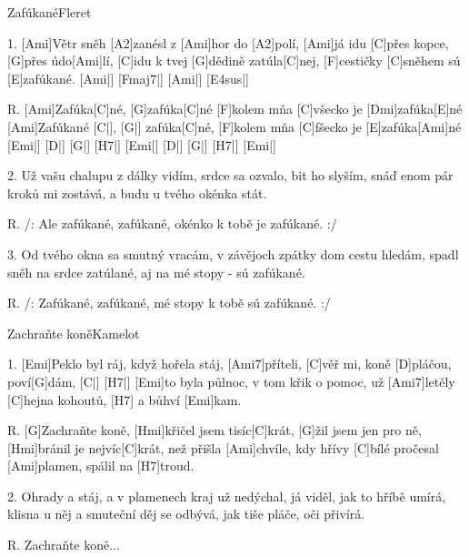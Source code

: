 \begin{song}{Zafúkané}{Fleret}

\begin{xverse}{1. }
[Ami]Větr sněh [A2]zanésl z [Ami]hor do [A2]polí,
[Ami]já idu [C]přes kopce, [G]přes údo[Ami]lí,
[C]idu k tvej [G]dědině zatúla[C]nej,
[F]cestičky [C]sněhem sú [E]zafúkané. [Ami|]{} [Fmaj7|]{} [Ami|]{} [E4sus|]{}
\end{xverse}


\begin{xverse}{R. }
[Ami]Zafúka[C]né, [G]zafúka[C]né
[F]kolem mňa [C]všecko je [Dmi]zafúka[E]né
[Ami]Zafúkané [C|]{}, [G|]{} zafúka[C]né,
[F]kolem mňa [C]fšecko je [E]zafúka[Ami]né
[Emi|]{} [D|]{} [G|]{} [H7|]{} [Emi|]{} [D|]{} [G|]{} [H7|]{} [Emi|]{}
\end{xverse}


\begin{xverse}{2. }
Už vašu chalupu z dálky vidím,
srdce sa ozvalo, bit ho slyším,
snáď enom pár kroků mi zostává,
a budu u tvého okénka stát.
\end{xverse}


\begin{xverse}{R. }
/: Ale zafúkané, zafúkané, okénko k tobě je zafúkané. :/
\end{xverse}


\begin{xverse}{3. }
Od tvého okna sa smutný vracám,
v závějoch zpátky dom cestu hledám,
spadl sněh na srdce zatúlané,
aj na mé stopy - sú zafúkané.
\end{xverse}


\begin{xverse}{R. }
/: Zafúkané, zafúkané, mé stopy k tobě sú zafúkané. :/
\end{xverse}

\end{song}

\begin{song}{Zachraňte koně}{Kamelot}
\begin{xverse}{1. }
[Emi]Peklo byl ráj, když hořela stáj, [Ami7]příteli,
[C]věř mi, koně [D]pláčou, poví[G]dám, [C|]{} [H7|]{}
[Emi]to byla půlnoc, v tom křik o pomoc, už [Ami7]letěly
[C]hejna kohoutů, [H7]{} a bůhví [Emi]kam.
\end{xverse}

\begin{xverse}{R. }
[G]Zachraňte koně, [Hmi]křičel jsem tisíc[C]krát,
[G]{žil} jsem jen pro ně, [Hmi]bránil je nejvíc[C]krát,
než přišla [Ami]chvíle, kdy hřívy [C]bílé
pročesal [Ami]plamen, spálil na [H7]troud.
\end{xverse}

\begin{xverse}{2. }
Ohrady a stáj, a v plamenech kraj už nedýchal,
já viděl, jak to hříbě umírá,
klisna u něj a smuteční děj se odbývá,
jak tiše pláče, oči přivírá.
\end{xverse}

\begin{xverse}{R. }
Zachraňte koně...
\end{xverse}

\end{song}
\chords{ \chordAmiSeven }

